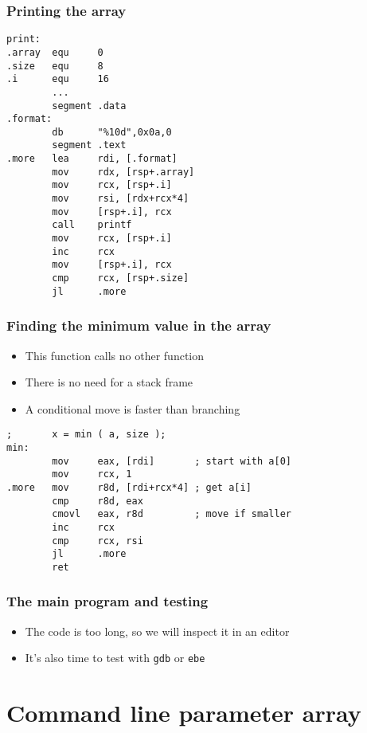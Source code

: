 \documentclass{beamer}
\begin{document}
\begin{frame}[fragile]
    \frametitle{Printing the array}
\footnotesize
\begin{verbatim}
print:
.array  equ     0
.size   equ     8
.i      equ     16
        ...
        segment .data
.format:
        db      "%10d",0x0a,0
        segment .text
.more   lea     rdi, [.format]
        mov     rdx, [rsp+.array]
        mov     rcx, [rsp+.i]
        mov     rsi, [rdx+rcx*4]
        mov     [rsp+.i], rcx
        call    printf
        mov     rcx, [rsp+.i]
        inc     rcx
        mov     [rsp+.i], rcx
        cmp     rcx, [rsp+.size]
        jl      .more
\end{verbatim}
\end{frame}

\begin{frame}[fragile]
    \frametitle{Finding the minimum value in the array}
    \begin{itemize}
        \item This function calls no other function
        \item There is no need for a stack frame
        \item A conditional move is faster than branching
    \end{itemize}

\begin{verbatim}
;       x = min ( a, size );
min:
        mov     eax, [rdi]       ; start with a[0]
        mov     rcx, 1
.more   mov     r8d, [rdi+rcx*4] ; get a[i]
        cmp     r8d, eax
        cmovl   eax, r8d         ; move if smaller
        inc     rcx
        cmp     rcx, rsi
        jl      .more
        ret
\end{verbatim}
\end{frame}

\begin{frame}
    \frametitle{The main program and testing}
    \begin{itemize}
        \item The code is too long, so we will inspect it in an editor
        \item It's also time to test with {\tt gdb} or {\tt ebe}
    \end{itemize}
\end{frame}

\section{Command line parameter array}
\end{document}
